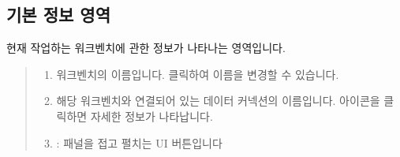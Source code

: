 \documentclass[letterpaper,10pt,english]{sphinxmanual}
\begin{document}
\subsection{기본 정보 영역}
\label{\detokenize{discovery/part06/06_03-use_a_workbench:workbench-use-1}}\label{\detokenize{discovery/part06/06_03-use_a_workbench:id2}}
현재 작업하는 워크벤치에 관한 정보가 나타나는 영역입니다.
\begin{quote}

\begin{figure}[H]
\centering

\noindent{}
\end{figure}
\begin{enumerate}
\def\theenumi{\arabic{enumi}}
\def\labelenumi{\theenumi .}
\makeatletter\def\p@enumii{\p@enumi \theenumi .}\makeatother
\item {} 
 워크벤치의 이름입니다. 클릭하여 이름을 변경할 수 있습니다.

\item {} 
 해당 워크벤치와 연결되어 있는 데이터 커넥션의 이름입니다.  아이콘을 클릭하면 자세한 정보가 나타납니다.

\item {} 
 : 패널을 접고 펼치는 UI 버튼입니다

\end{enumerate}
\end{quote}
\end{document}
